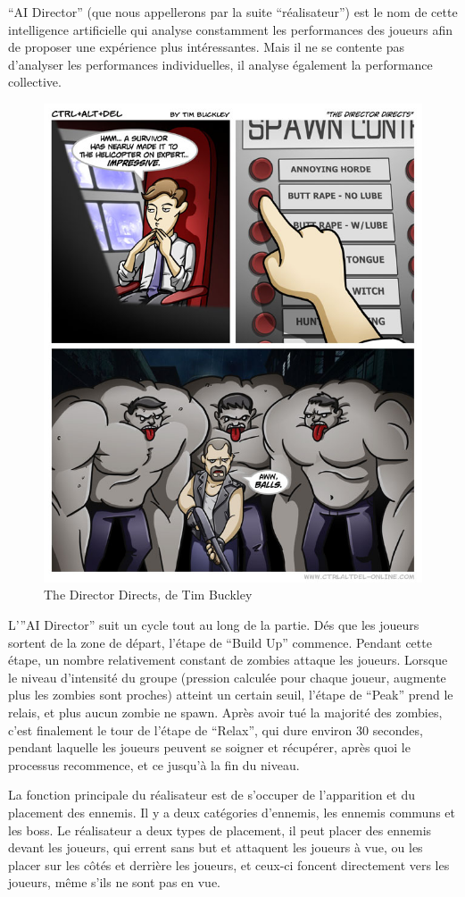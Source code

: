 \documentclass[a4paper, 12pt]{article} %
\begin{document}
“AI Director” (que nous appellerons par la suite “réalisateur”) est le nom de cette intelligence artificielle qui analyse constamment les performances des joueurs afin de proposer une expérience plus intéressantes. Mais il ne se contente pas d’analyser les performances individuelles, il analyse également la performance collective.

\begin{figure}[!h]%
	\begin{center} 
		\includegraphics[width=0.60\columnwidth]{images/aiDirector.png}%
		\caption{The Director Directs, de Tim Buckley}%
	\end{center}
\end{figure}

L’”AI Director” suit un cycle tout au long de la partie. Dés que les joueurs sortent de la zone de départ, l’étape de “Build Up” commence. Pendant cette étape, un nombre relativement constant de zombies attaque les joueurs. Lorsque le niveau d’intensité du groupe (pression calculée pour chaque joueur, augmente plus les zombies sont proches) atteint un certain seuil, l’étape de “Peak” prend le relais, et plus aucun zombie ne spawn. Après avoir tué la majorité des zombies, c’est finalement le tour de l’étape de “Relax”, qui dure environ 30 secondes, pendant laquelle les joueurs peuvent se soigner et récupérer, après quoi le processus recommence, et ce jusqu’à la fin du niveau.

La fonction principale du réalisateur est de s’occuper de l’apparition et du placement des ennemis. Il y a deux catégories d’ennemis, les ennemis communs et les boss. Le réalisateur a deux types de placement, il peut placer des ennemis devant les joueurs, qui errent sans but et attaquent les joueurs à vue, ou les placer sur les côtés et derrière les joueurs, et ceux-ci foncent directement vers les joueurs, même s’ils ne sont pas en vue.
\end{document}
